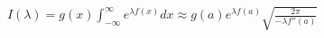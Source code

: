 \documentclass[preview]{standalone}
\begin{document}
\begin{align*}
I(\lambda) = \displaystyle g(x) \int_{-\infty}^{\infty} e^{\lambda f(x)} dx \approx g(a) \displaystyle e^{\lambda f(a)} \sqrt{\frac{2\pi}{-\lambda f''(a)}}
\end{align*}
\end{document}
